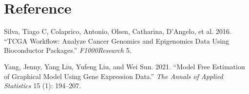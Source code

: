 \documentclass[
]{book}
\newlength{\cslhangindent}
\newlength{\cslentryspacingunit} %
\newenvironment{CSLReferences}[2] %
 {%
  \setlength{\parindent}{0pt}
  \ifodd #1
  \let\oldpar\par
  \def\par{\hangindent=\cslhangindent\oldpar}
  \fi
  \setlength{\parskip}{#2\cslentryspacingunit}
 }%
 {}
\begin{document}
\hypertarget{reference}{%
\chapter{Reference}\label{reference}}

\hypertarget{refs}{}
\begin{CSLReferences}{1}{0}
\leavevmode{}%
Silva, Tiago C, Colaprico, Antonio, Olsen, Catharina, D'Angelo, et al. 2016. {``TCGA Workflow: Analyze Cancer Genomics and Epigenomics Data Using Bioconductor Packages.''} \emph{F1000Research} 5.

\leavevmode{}%
Yang, Jenny, Yang Liu, Yufeng Liu, and Wei Sun. 2021. {``Model Free Estimation of Graphical Model Using Gene Expression Data.''} \emph{The Annals of Applied Statistics} 15 (1): 194--207.

\end{CSLReferences}
\end{document}
